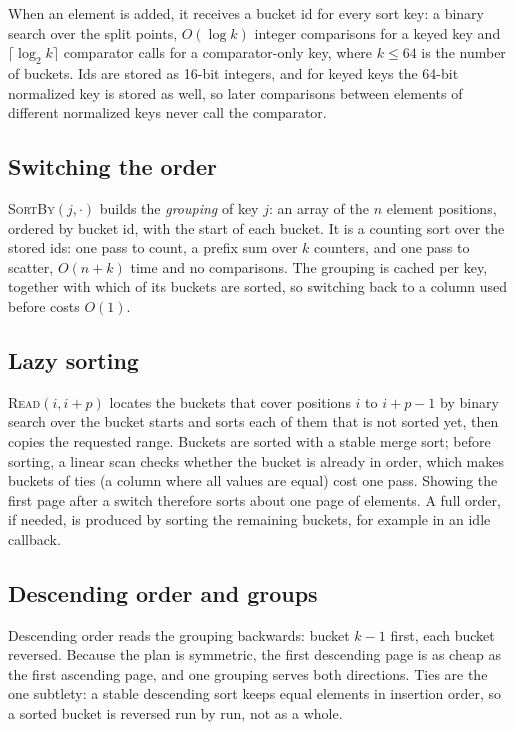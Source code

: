 \documentclass[11pt]{article}
\theoremstyle{definition}
\begin{document}
When an element is added, it receives a bucket id for every sort key: a binary
search over the split points, $O(\log k)$ integer comparisons for a keyed key
and $\lceil \log_2 k\rceil$ comparator calls for a comparator-only key, where
$k \le 64$ is the number of buckets. Ids are stored as 16-bit integers, and for
keyed keys the 64-bit normalized key is stored as well, so later comparisons
between elements of different normalized keys never call the comparator.

\subsection{Switching the order}

\textsc{SortBy}$(j, \cdot)$ builds the \emph{grouping} of key $j$: an array of
the $n$ element positions, ordered by bucket id, with the start of each bucket.
It is a counting sort over the stored ids: one pass to count, a prefix sum over
$k$ counters, and one pass to scatter, $O(n + k)$ time and no comparisons. The
grouping is cached per key, together with which of its buckets are sorted, so
switching back to a column used before costs $O(1)$.

\subsection{Lazy sorting}

\textsc{Read}$(i, i+p)$ locates the buckets that cover positions $i$ to
$i+p-1$ by binary search over the bucket starts and sorts each of them that is
not sorted yet, then copies the requested range. Buckets are sorted with a
stable merge sort; before sorting, a linear scan checks whether the bucket is
already in order, which makes buckets of ties (a column where all values are
equal) cost one pass. Showing the first page after a switch therefore sorts
about one page of elements. A full order, if needed, is produced by sorting
the remaining buckets, for example in an idle callback.

\subsection{Descending order and groups}

Descending order reads the grouping backwards: bucket $k-1$ first, each bucket
reversed. Because the plan is symmetric, the first descending page is as cheap
as the first ascending page, and one grouping serves both directions. Ties are
the one subtlety: a stable descending sort keeps equal elements in insertion
order, so a sorted bucket is reversed run by run, not as a whole.
\end{document}
